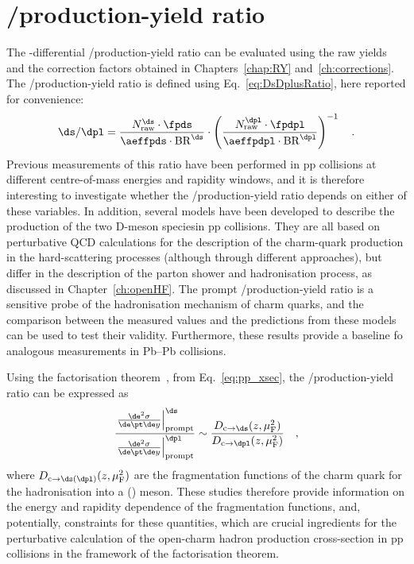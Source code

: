\chapter{\texorpdfstring{\ds/\dpl production-yield ratio}{Ds+/D+ production-yield ratio}}\label{ch:results}
The \pt-differential \ds/\dpl production-yield ratio can be evaluated using the raw yields and the correction factors obtained in Chapters~\ref{chap:RY} and~\ref{ch:corrections}. The \ds/\dpl production-yield ratio is defined using Eq.~\ref{eq:DsDplusRatio}, here reported for convenience:
\begin{equation*}
    \ds/\dpl = \frac{N_\mathrm{raw}^{\ds}\cdot \fpds}{\aeffpds \cdot \mathrm{BR}^\ds} \cdot \left(\frac{N_\mathrm{raw}^{\dpl}\cdot \fpdpl}{\aeffpdpl \cdot \mathrm{BR}^\dpl}\right)^{-1}\quad .
\end{equation*}
Previous measurements of this ratio have been performed in pp collisions at different centre-of-mass energies and rapidity windows, and it is therefore interesting to investigate whether the \ds/\dpl production-yield ratio depends on either of these variables. In addition, several models have been developed to describe the production of the two D-meson speciesin pp collisions. They are all based on perturbative QCD calculations for the description of the charm-quark production in the hard-scattering processes (although through different approaches), but differ in the description of the parton shower and hadronisation process, as discussed in Chapter~\ref{ch:openHF}. The prompt \ds/\dpl production-yield ratio is a sensitive probe of the hadronisation mechanism of charm quarks, and the comparison between the measured values and the predictions from these models can be used to test their validity. Furthermore, these results provide a baseline fo analogous measurements in Pb--Pb collisions.

Using the factorisation theorem~\cite{Collins:1989gx}, from Eq.~\ref{eq:pp_xsec}, the \ds/\dpl production-yield ratio can be expressed as
\begin{equation*}
    \frac{\left.\frac{\de^2\sigma}{\de\pt\de y}\right\vert^\ds_\mathrm{prompt}}{\left.\frac{\de^2\sigma}{\de\pt\de y}\right\vert^\dpl_\mathrm{prompt}} \sim \frac{D_\mathrm{c\rightarrow \ds}(z,\mu_\mathrm{F}^2)}{D_\mathrm{c\rightarrow \dpl}(z,\mu_\mathrm{F}^2)}\quad ,
\end{equation*}
where $D_\mathrm{c\rightarrow \ds (\dpl)}(z,\mu_\mathrm{F}^2)$ are the fragmentation functions of the charm quark for the hadronisation into a \ds (\dpl) meson. These studies therefore provide information on the energy and rapidity dependence of the fragmentation functions, and, potentially, constraints for these quantities, which are crucial ingredients for the perturbative calculation of the open-charm hadron production cross-section in pp collisions in the framework of the factorisation theorem. 

